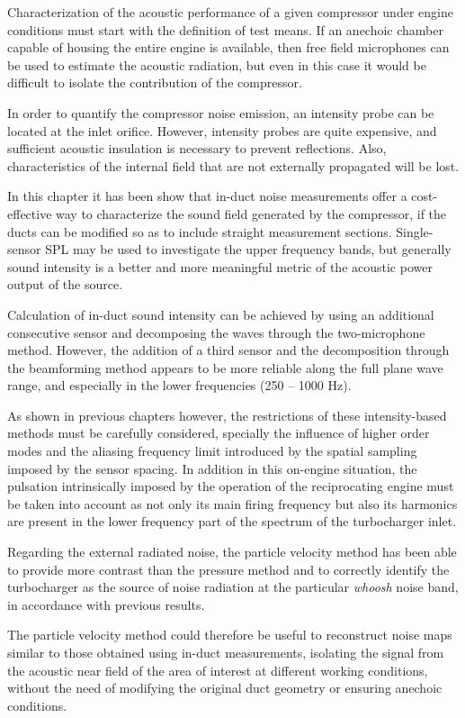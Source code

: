 Characterization of the acoustic performance of a given compressor under engine conditions must start with the definition of test means. If an anechoic chamber capable of housing the entire engine is available, then free field microphones can be used to estimate the acoustic radiation, but even in this case it would be difficult to isolate the contribution of the compressor.

In order to quantify the compressor noise emission, an intensity probe can be located at the inlet orifice. However, intensity probes are quite expensive, and sufficient acoustic insulation is necessary to prevent reflections. Also, characteristics of the internal field that are not externally propagated will be lost.

In this chapter it has been show that in-duct noise measurements offer a cost-effective way to characterize the sound field generated by the compressor, if the ducts can be modified so as to include straight measurement sections. Single-sensor SPL may be used to investigate the upper frequency bands, but generally sound intensity is a better and more meaningful metric of the acoustic power output of the source.

Calculation of in-duct sound intensity can be achieved by using an additional consecutive sensor and decomposing the waves through the two-microphone method. However, the addition of a third sensor and the decomposition through the beamforming method appears to be more reliable along the full plane wave range, and especially in the lower frequencies (250 -- 1000 Hz).

As shown in previous chapters however, the restrictions of these intensity-based methods must be carefully considered, specially the influence of higher order modes and the aliasing frequency limit introduced by the spatial sampling imposed by the sensor spacing. In addition in this on-engine situation, the pulsation intrinsically imposed by the operation of the reciprocating engine must be taken into account as not only its main firing frequency but also its harmonics are present in the lower frequency part of the spectrum of the turbocharger inlet.

Regarding the external radiated noise, the particle velocity method has been able to provide more contrast than the pressure method and to correctly identify the turbocharger as the source of noise radiation at the particular \emph{whoosh} noise band, in accordance with previous results.

The particle velocity method could therefore be useful to reconstruct noise maps similar to those obtained using in-duct measurements, isolating the signal from the acoustic near field of the area of interest at different working conditions, without the need of modifying the original duct geometry or ensuring anechoic conditions.
